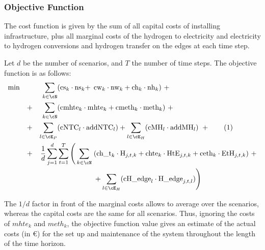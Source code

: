 
\subsubsection{Objective Function}

The cost function is given by the sum of all capital costs of installing infrastructure, plus all marginal costs of the hydrogen to electricity and electricity to hydrogen conversions and hydrogen transfer on the edges at each time step.

Let $d$ be the number of scenarios, and $T$ the number of time steps. The objective function is as follows:
\begin{align*}
    \min \quad 
    &&\sum_{k\in\cN}&(\text{cs}_k \cdot \text{ns}_k+\hspace{-1em}&&\text{cw}_k \cdot \text{nw}_k + \text{ch}_k \cdot \text{nh}_k )\ + \\
    &+& \sum_{k\in\cN}&(\text{cmhte}_k\cdot\text{m} \hspace{-1em}&& \text{hte}_k + \text{cmeth}_k\cdot \text{meth}_k) \ + \\
    &+& \sum_{l\in\cE_P}& (\text{cNTC}_l\cdot \text{ad}\hspace{-1em}&&\text{dNTC}_l) 
    + \sum_{l\in\cE_H} (\text{cMH}_l\cdot \text{addMH}_l) \ + \stepcounter{equation}\tag{\theequation}\label{objVal} \\   
    &+&\frac{1}{d}\sum_{j=1}^{d}&\sum_{t=1}^{T} \Bigg(\sum_{k\in\cN} \hspace{-5em}&&
    (\text{ch\_t}_k \cdot \text{H}_{j,t,k} + \text{chte}_k \cdot \text{HtE}_{j,t,k} + \text{ceth}_k \cdot \text{EtH}_{j,t,k})\ + \\
    &&&\hspace{-2em}&&+\sum_{l\in\cE_H} (\text{cH\_edge}_l\cdot\text{H\_edge}_{j,t,l}) \Bigg)
\end{align*}

The $1/d$ factor in front of the marginal costs allows to average over the scenarios, whereas the capital costs are the same for all scenarios. 
Thus, ignoring the costs of $mhte_k$ and $meth_k$, the objective function value gives an estimate of the actual costs (in \euro) for the set up and maintenance of the system throughout the length of the time horizon. 



